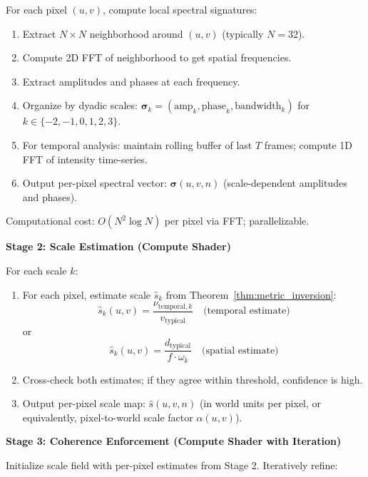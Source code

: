 \documentclass[11pt,twocolumn,a4paper]{article}
\theoremstyle{definition}
\begin{document}
For each pixel $(u, v)$, compute local spectral signatures:

\begin{enumerate}[leftmargin=1.4em]
  \item Extract $N \times N$ neighborhood around $(u,v)$ (typically $N=32$).
  \item Compute 2D FFT of neighborhood to get spatial frequencies.
  \item Extract amplitudes and phases at each frequency.
  \item Organize by dyadic scales: $\bm{\sigma}_k = (\text{amp}_k, \text{phase}_k, \text{bandwidth}_k)$ for $k \in \{-2, -1, 0, 1, 2, 3\}$.
  \item For temporal analysis: maintain rolling buffer of last $T$ frames; compute 1D FFT of intensity time-series.
  \item Output per-pixel spectral vector: $\bm{\sigma}(u,v,n)$ (scale-dependent amplitudes and phases).
\end{enumerate}

Computational cost: $O(N^2 \log N)$ per pixel via FFT; parallelizable.

\textbf{Stage 2: Scale Estimation (Compute Shader)}

For each scale $k$:

\begin{enumerate}[leftmargin=1.4em]
  \item For each pixel, estimate scale $\hat{s}_k$ from Theorem~\ref{thm:metric_inversion}:
    \begin{equation}
    \hat{s}_k(u,v) = \frac{\nu_{\text{temporal},k}}{v_{\text{typical}}} \quad \text{(temporal estimate)}
    \end{equation}
    or
    \begin{equation}
    \hat{s}_k(u,v) = \frac{d_{\text{typical}}}{f \cdot \omega_k} \quad \text{(spatial estimate)}
    \end{equation}
  \item Cross-check both estimates; if they agree within threshold, confidence is high.
  \item Output per-pixel scale map: $\hat{s}(u,v,n)$ (in world units per pixel, or equivalently, pixel-to-world scale factor $\alpha(u,v)$).
\end{enumerate}

\textbf{Stage 3: Coherence Enforcement (Compute Shader with Iteration)}

Initialize scale field with per-pixel estimates from Stage 2. Iteratively refine:
\end{document}
